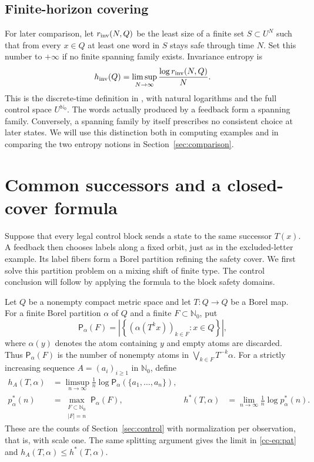\documentclass[11pt,reqno]{amsart}
\numberwithin{equation}{section}
\theoremstyle{definition}
\theoremstyle{definition}
\newcommand{\Nzero}{\mathbb N_0}
\newcommand{\Patt}{\mathsf P}
\newcommand{\hpat}{h^{*}}
\newcommand{\hinv}{h_{\mathrm{inv}}}
\begin{document}
\subsection{Finite-horizon covering}
For later comparison, let $r_{\rm inv}(N,Q)$ be the least size of a
finite set $S\subset U^N$ such that from every $x\in Q$ at least
one word in $S$ stays safe through time $N$. Set this number to
$+\infty$ if no finite spanning family exists. Invariance entropy is
\begin{equation}\label{eq:hinv-definition}
 \hinv(Q)=\limsup_{N\to\infty}\frac{\log r_{\rm inv}(N,Q)}{N}.
\end{equation}
This is the discrete-time definition in
\cite[Definition~2.2]{Kawan2013}, with natural logarithms and the
full control space $U^{\Nzero}$. The words actually produced by a
feedback form a spanning family. Conversely, a spanning family by
itself prescribes no consistent choice at later states. We will use
this distinction both in computing examples and in comparing the
two entropy notions in Section~\ref{sec:comparison}.

\section{Common successors and a closed-cover formula}\label{sec:closed-cover}

Suppose that every legal control block sends a state to the same
successor $T(x)$. A feedback then chooses labels along a fixed orbit,
just as in the excluded-letter example. Its label fibers form a Borel
partition refining the safety cover. We first solve this partition
problem on a mixing shift of finite type. The control conclusion will
follow by applying the formula to the block safety domains.

Let $Q$ be a nonempty compact metric space and let $T:Q\to Q$ be a Borel
map. For a finite Borel partition $\alpha$ of $Q$ and a finite
$F\subset\Nzero$, put
\[
 \Patt_\alpha(F)=
 \left|\left\{(\alpha(T^k x))_{k\in F}:x\in Q\right\}\right|,
\]
where $\alpha(y)$ denotes the atom containing $y$ and empty atoms are
discarded. Thus $\Patt_\alpha(F)$ is the number of nonempty atoms in
$\bigvee_{k\in F}T^{-k}\alpha$. For a strictly increasing sequence
$A=(a_i)_{i\ge1}$ in $\Nzero$, define
\begin{align}
 h_A(T,\alpha)&=\limsup_{n\to\infty}\frac1n
       \log\Patt_\alpha(\{a_1,\ldots,a_n\}),\label{cc-eq:seq}\\
 p_\alpha^*(n)&=\max_{\substack{F\subset\Nzero\\ |F|=n}}
                    \Patt_\alpha(F),
 &\hpat(T,\alpha)&=\lim_{n\to\infty}\frac1n\log p_\alpha^*(n).
 \label{cc-eq:pat}
\end{align}
These are the counts of Section~\ref{sec:control} with normalization
per observation, that is, with scale one. The same splitting argument
gives the limit in \eqref{cc-eq:pat} and
$h_A(T,\alpha)\le\hpat(T,\alpha)$.
\end{document}
